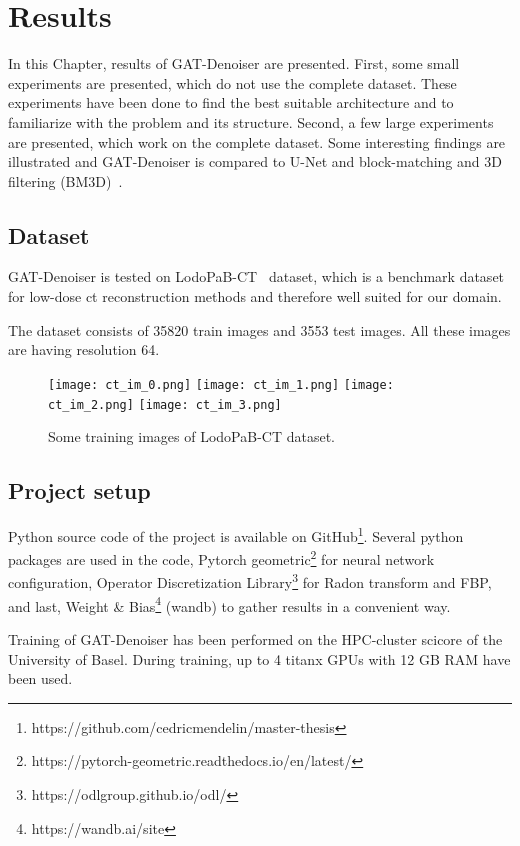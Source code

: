 \chapter{Results}
\label{sec:results}

In this Chapter, results of GAT-Denoiser are presented.
First, some small experiments are presented, which do not use the complete dataset.
These experiments have been done to find the best suitable architecture and to 
familiarize with the problem and its structure.
Second, a few large experiments are presented, which work on the complete dataset.
Some interesting findings are illustrated and GAT-Denoiser
is compared to U-Net and block-matching and 3D filtering (BM3D)~\cite{bm3d}.


\section{Dataset}
GAT-Denoiser is tested on LodoPaB-CT~\cite{lodopab-dataset} dataset, which is a 
benchmark dataset for low-dose ct reconstruction methods and therefore well suited for our domain.

The dataset consists of 35820 train images and 3553 test images.
All these images are having resolution 64.

\begin{figure}[H]
  \centering
  \hfill
  \texttt{[image: ct\_im\_0.png]}
  \hfill
  \texttt{[image: ct\_im\_1.png]}
  \hfill
  \texttt{[image: ct\_im\_2.png]}
  \hfill
  \texttt{[image: ct\_im\_3.png]}
  \hfill
  \caption{Some training images of LodoPaB-CT dataset.}
\end{figure}



\section{Project setup}
Python source code of the project is available on GitHub\footnote{https://github.com/cedricmendelin/master-thesis}.
Several python packages are used in the code, Pytorch geometric\footnote{https://pytorch-geometric.readthedocs.io/en/latest/} 
for neural network configuration, Operator Discretization Library\footnote{https://odlgroup.github.io/odl/} for Radon transform and FBP, 
and last, Weight \& Bias\footnote{https://wandb.ai/site} (wandb) to gather results in a convenient way.

Training of GAT-Denoiser has been performed on the HPC-cluster scicore of the University of Basel.
During training, up to 4 titanx GPUs with 12 GB RAM have been used.


